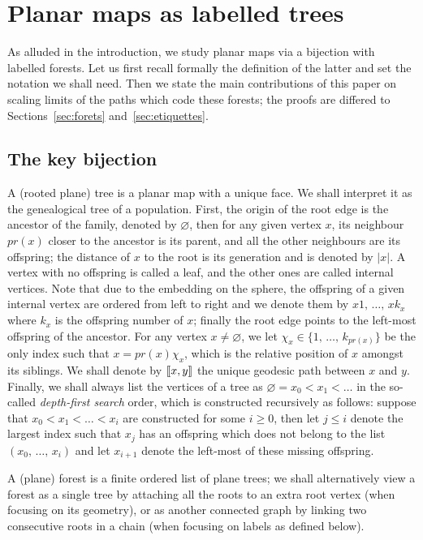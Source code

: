 \documentclass[AHL,Unicode,longabstracts,published]{cedram}
\newcommand{\llbracket}{\mathopen{[\mkern -2.7mu[}}
\newcommand{\rrbracket}{\mathclose{]\mkern -2.7mu]}}
\newcommand{\1}{\ensembles{1}}
\renewcommand{\le}{\leqslant}
\renewcommand{\ge}{\geqslant}
\begin{document}
\section{Planar maps as labelled trees}\label{sec:preliminaires}


As alluded in the introduction, we study planar maps via a bijection with labelled forests. Let us first recall formally the definition of the latter and set the notation we shall need. Then we state the main contributions of this paper on scaling limits of the paths which code these forests; the proofs are differed to Sections~\ref{sec:forets} and~\ref{sec:etiquettes}.


\subsection{The key bijection}\label{sec:bijection}

A (rooted plane) tree is a planar map with a unique face. We shall interpret it as the genealogical tree of a population. First, the origin of the root edge is the ancestor of the family, denoted by $\varnothing$, then for any given vertex $x$, its neighbour $pr(x)$ closer to the ancestor is its parent, and all the other neighbours are its offspring; the distance of $x$ to the root is its generation and is denoted by $|x|$. A vertex with no offspring is called a leaf, and the other ones are called internal vertices. Note that due to the embedding on the sphere, the offspring of a given internal vertex are ordered from left to right and we denote them by $x1,\,\dots,\,xk_x$ where $k_x$ is the offspring number of $x$; finally the root edge points to the left-most offspring of the ancestor. For any vertex $x \ne \varnothing$, we let $\chi_x \in \{1,\,\dots, \,k_{pr(x)}\}$ be the only index such that $x=pr(x) \chi_x$, which is the relative position of $x$ amongst its siblings. We shall denote by $\llbracket x, y \rrbracket$ the unique geodesic path between $x$ and $y$. Finally, we shall always list the vertices of a tree as $\varnothing = x_0 < x_1 < \dots$ in the so-called \emph{depth-first search} order, which is constructed recursively as follows: suppose that $x_0 < x_1 < \dots < x_i$ are constructed for some $i\ge 0$, then let $j \le i$ denote the largest index such that $x_j$ has an offspring which does not belong to the list $(x_0,\,\dots,\,x_i)$ and let $x_{i+1}$ denote the left-most of these missing offspring.


A (plane) forest is a finite ordered list of plane trees; we shall alternatively view a forest as a single tree by attaching all the roots to an extra root vertex (when focusing on its geometry), or as another connected graph by linking two consecutive roots in a chain (when focusing on labels as defined below).
\end{document}
